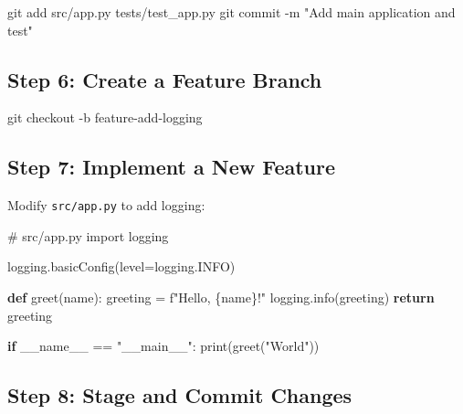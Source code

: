 \documentclass[
  letterpaper,
  DIV=11,
  numbers=noendperiod]{scrreprt}
\newenvironment{Shaded}{\begin{snugshade}}{\end{snugshade}}
\newcommand{\AttributeTok}[1]{\textcolor[rgb]{0.40,0.45,0.13}{#1}}
\newcommand{\BuiltInTok}[1]{\textcolor[rgb]{0.00,0.23,0.31}{#1}}
\newcommand{\CommentTok}[1]{\textcolor[rgb]{0.37,0.37,0.37}{#1}}
\newcommand{\ControlFlowTok}[1]{\textcolor[rgb]{0.00,0.23,0.31}{\textbf{#1}}}
\newcommand{\FunctionTok}[1]{\textcolor[rgb]{0.28,0.35,0.67}{#1}}
\newcommand{\ImportTok}[1]{\textcolor[rgb]{0.00,0.46,0.62}{#1}}
\newcommand{\KeywordTok}[1]{\textcolor[rgb]{0.00,0.23,0.31}{\textbf{#1}}}
\newcommand{\NormalTok}[1]{\textcolor[rgb]{0.00,0.23,0.31}{#1}}
\newcommand{\OperatorTok}[1]{\textcolor[rgb]{0.37,0.37,0.37}{#1}}
\newcommand{\SpecialCharTok}[1]{\textcolor[rgb]{0.37,0.37,0.37}{#1}}
\newcommand{\SpecialStringTok}[1]{\textcolor[rgb]{0.13,0.47,0.30}{#1}}
\newcommand{\StringTok}[1]{\textcolor[rgb]{0.13,0.47,0.30}{#1}}
\newcommand{\VariableTok}[1]{\textcolor[rgb]{0.07,0.07,0.07}{#1}}
\begin{document}
\begin{Shaded}
\begin{Highlighting}[]
\FunctionTok{git}\NormalTok{ add src/app.py tests/test\_app.py}
\FunctionTok{git}\NormalTok{ commit }\AttributeTok{{-}m} \StringTok{"Add main application and test"}
\end{Highlighting}
\end{Shaded}

\subsection{Step 6: Create a Feature
Branch}\label{step-6-create-a-feature-branch}

\begin{Shaded}
\begin{Highlighting}[]
\FunctionTok{git}\NormalTok{ checkout }\AttributeTok{{-}b}\NormalTok{ feature{-}add{-}logging}
\end{Highlighting}
\end{Shaded}

\subsection{Step 7: Implement a New
Feature}\label{step-7-implement-a-new-feature}

Modify \texttt{src/app.py} to add logging:

\begin{Shaded}
\begin{Highlighting}[]
\CommentTok{\# src/app.py}
\ImportTok{import}\NormalTok{ logging}

\NormalTok{logging.basicConfig(level}\OperatorTok{=}\NormalTok{logging.INFO)}

\KeywordTok{def}\NormalTok{ greet(name):}
\NormalTok{    greeting }\OperatorTok{=} \SpecialStringTok{f"Hello, }\SpecialCharTok{\{}\NormalTok{name}\SpecialCharTok{\}}\SpecialStringTok{!"}
\NormalTok{    logging.info(greeting)}
    \ControlFlowTok{return}\NormalTok{ greeting}

\ControlFlowTok{if} \VariableTok{\_\_name\_\_} \OperatorTok{==} \StringTok{"\_\_main\_\_"}\NormalTok{:}
    \BuiltInTok{print}\NormalTok{(greet(}\StringTok{"World"}\NormalTok{))}
\end{Highlighting}
\end{Shaded}

\subsection{Step 8: Stage and Commit
Changes}\label{step-8-stage-and-commit-changes}
\end{document}
